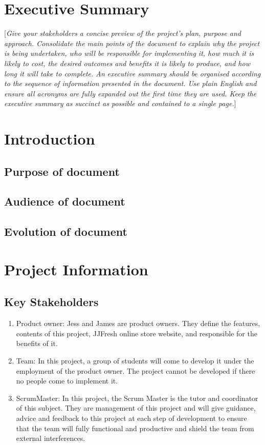 \documentclass{report}
\begin{document}
\chapter*{Executive Summary}\label{sec:ESummary}
[\textit{Give your stakeholders a concise preview of the project’s plan, purpose and approach. Consolidate the main points of the document to explain why the project is being undertaken, who will be responsible for implementing it, how much it is likely to cost, the desired outcomes and benefits it is likely to produce, and how long it will take to complete. An executive summary should be organised according to the sequence of information presented in the document. Use plain English and ensure all acronyms are fully expanded out the first time they are used. Keep the executive summary as succinct as possible and contained to a single page.}]
\pagebreak
\clearpage

\tableofcontents
\pagebreak

\chapter{Introduction}
\section{Purpose of document}
\section{Audience of document}
\section{Evolution of document}

\chapter{Project Information}
\section{Key Stakeholders}
\begin{enumerate}
  \item Product owner: Jess and James are product owners. They define the features, contents of this project, JJFresh online store website, and responsible for the benefits of it.
  \item Team: In this project, a group of students will come to develop it under the employment of the product owner. The project cannot be developed if there no people come to implement it.
  \item ScrumMaster: In this project, the Scrum Master is the tutor and coordinator of this subject. They are management of this project and will give guidance, advice and feedback to this project at each step of development to ensure that the team will fully functional and productive and shield the team from external interferences.
\end{enumerate}
\end{document}

